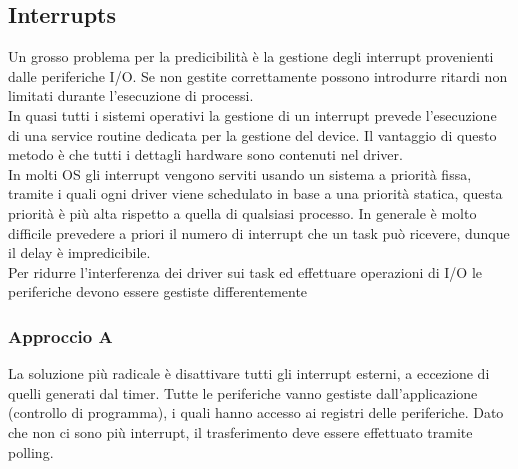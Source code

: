 \documentclass[12pt]{article}
\begin{document}
\subsection{Interrupts}
Un grosso problema per la predicibilità è la gestione degli interrupt provenienti dalle periferiche I/O.
Se non gestite correttamente possono introdurre ritardi non limitati durante l'esecuzione di processi.\\
In quasi tutti i sistemi operativi la gestione di un interrupt prevede l'esecuzione di una service routine dedicata per la gestione del device.
Il vantaggio di questo metodo è che tutti i dettagli hardware sono contenuti nel driver.\\
In molti OS gli interrupt vengono serviti usando un sistema a priorità fissa, tramite i quali ogni driver viene schedulato in base a una priorità statica, questa priorità è più alta rispetto a quella di qualsiasi processo.
In generale è molto difficile prevedere a priori il numero di interrupt che un task può ricevere, dunque il delay è impredicibile.
\\
Per ridurre l'interferenza dei driver sui task ed effettuare operazioni di I/O le periferiche devono essere gestiste differentemente
\subsubsection{Approccio A}
La soluzione più radicale è disattivare tutti gli interrupt esterni, a eccezione di quelli generati dal timer.
Tutte le periferiche vanno gestiste dall'applicazione (controllo di programma), i quali hanno accesso ai registri delle periferiche.
Dato che non ci sono più interrupt, il trasferimento deve essere effettuato tramite polling.
\end{document}

